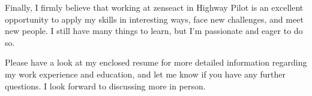 \documentclass[11pt,a4paper,sans]{moderncv}        %
\begin{document}
Finally, I firmly believe that working at zenseact in Highway Pilot is
an excellent opportunity to apply my skills in interesting ways, face
new challenges, and meet new people. I still have many things to
learn, but I’m passionate and eager to do so.

Please have a look at my enclosed resume for more detailed information
regarding my work experience and education, and let me know if you
have any further questions. I look forward to discussing more in
person.

\makeletterclosing
\end{document}
